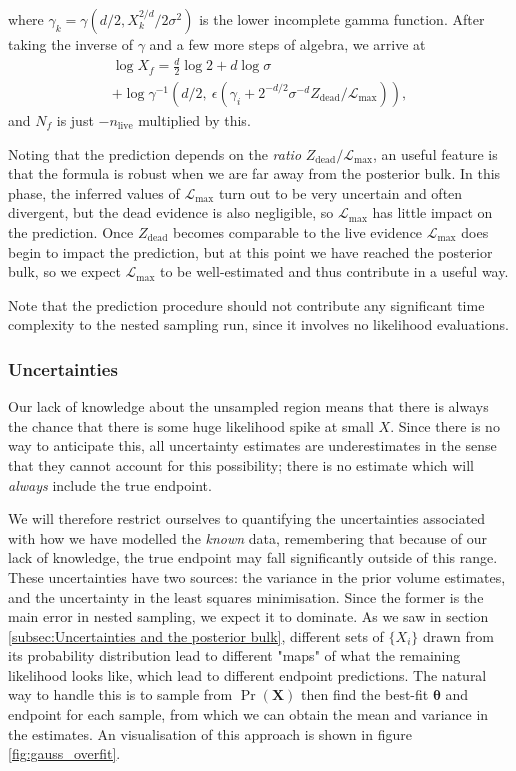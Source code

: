 \documentclass[usenatbib]{mnras} %
\newcommand{\thetab}{\bm{\theta}}
\newcommand{\set}[1]{\{#1\}}
\newcommand{\nlive}{n_\mathrm{live}}
\newcommand{\Like}{\mathcal{L}}
\begin{document}
where $\gamma_k = \gamma\left(d/2, X_k^{2/d}/2\sigma^2\right)$ is the lower incomplete gamma function. After taking the inverse of  $\gamma$ and a few more steps of algebra, we arrive at
\begin{multline}
	\log X_f = \frac{d}{2}\log 2 + d \log \sigma \\
	+ \log \gamma^{-1} \left( d/2 ,\ \epsilon \left(\gamma_i+ 2^{-d/2} \sigma^{-d} Z_\mathrm{dead}/\Like_\mathrm{max}\right)\right),
\end{multline}
and $N_f$ is just  $-\nlive$ multiplied by this. 
\par
Noting that the prediction depends on the \textit{ratio} $Z_\mathrm{dead}/\Like_\mathrm{max}$, an useful feature is that the formula is robust when we are far away from the posterior bulk. In this phase, the inferred values of $\Like_\mathrm{max}$ turn out to be very uncertain and often divergent, but the dead evidence is also negligible, so $\Like_\mathrm{max}$ has little impact on the prediction. Once $Z_\mathrm{dead}$ becomes comparable to the live evidence $\Like_\mathrm{max}$ does begin to impact the prediction, but at this point we have reached the posterior bulk, so we expect $\Like_\mathrm{max}$ to be well-estimated and thus contribute in a useful way.
\par
Note that the prediction procedure should not contribute any significant time complexity to the nested sampling run, since it involves no likelihood evaluations. 

\subsubsection{Uncertainties}
Our lack of knowledge about the unsampled region means that there is always the chance that there is some huge likelihood spike at small $X$. Since there is no way to anticipate this, all uncertainty estimates are underestimates in the sense that they cannot account for this possibility; there is no estimate which will \textit{always} include the true endpoint. 
\par
We will therefore restrict ourselves to quantifying the uncertainties associated with how we have modelled the \textit{known} data, remembering that because of our lack of knowledge, the true endpoint may fall significantly outside of this range. These uncertainties have two sources: the variance in the prior volume estimates, and the uncertainty in the least squares minimisation. Since the former is the main error in nested sampling, we expect it to dominate. As we saw in section \ref{subsec:Uncertainties and the posterior bulk}, different sets of $\set{X_i}$ drawn from its probability distribution lead to different "maps" of what the remaining likelihood looks like, which lead to different endpoint predictions. The natural way to handle this is to sample from $\Pr(\bm{X})$ then find the best-fit  $\thetab$ and endpoint for each sample, from which we can obtain the mean and variance in the estimates. An visualisation of this approach is shown in figure \ref{fig:gauss_overfit}.
\end{document}
